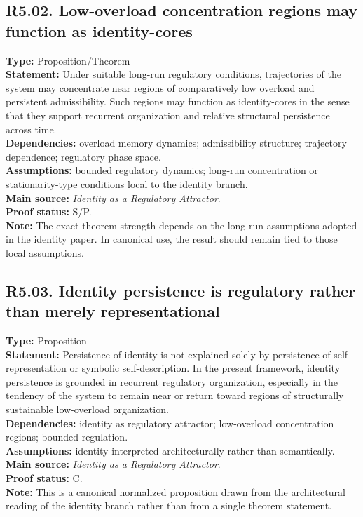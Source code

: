 \documentclass[12pt]{article}
\begin{document}
	\subsection*{R5.02. Low-overload concentration regions may function as identity-cores}
	\textbf{Type:} Proposition/Theorem \\
	\textbf{Statement:} Under suitable long-run regulatory conditions, trajectories of the system
	may concentrate near regions of comparatively low overload and persistent admissibility. Such
	regions may function as identity-cores in the sense that they support recurrent organization
	and relative structural persistence across time. \\
	\textbf{Dependencies:} overload memory dynamics; admissibility structure; trajectory dependence;
	regulatory phase space. \\
	\textbf{Assumptions:} bounded regulatory dynamics; long-run concentration or stationarity-type
	conditions local to the identity branch. \\
	\textbf{Main source:} \emph{Identity as a Regulatory Attractor}. \\
	\textbf{Proof status:} S/P. \\
	\textbf{Note:} The exact theorem strength depends on the long-run assumptions adopted in the
	identity paper. In canonical use, the result should remain tied to those local assumptions.
	
	\subsection*{R5.03. Identity persistence is regulatory rather than merely representational}
	\textbf{Type:} Proposition \\
	\textbf{Statement:} Persistence of identity is not explained solely by persistence of
	self-representation or symbolic self-description. In the present framework, identity persistence
	is grounded in recurrent regulatory organization, especially in the tendency of the system to
	remain near or return toward regions of structurally sustainable low-overload organization. \\
	\textbf{Dependencies:} identity as regulatory attractor; low-overload concentration regions;
	bounded regulation. \\
	\textbf{Assumptions:} identity interpreted architecturally rather than semantically. \\
	\textbf{Main source:} \emph{Identity as a Regulatory Attractor}. \\
	\textbf{Proof status:} C. \\
	\textbf{Note:} This is a canonical normalized proposition drawn from the architectural reading
	of the identity branch rather than from a single theorem statement.
	
\end{document}
